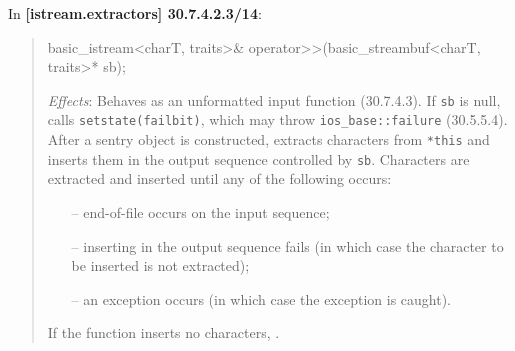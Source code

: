 \documentclass{wg21}
\begin{document}
In \textbf{[istream.extractors] 30.7.4.2.3/14}:
\begin{quote}
\begin{codeblock}
basic_istream<charT, traits>& operator>>(basic_streambuf<charT, traits>* sb);
\end{codeblock}
\textit{Effects}: Behaves as an unformatted input function (30.7.4.3). If \texttt{sb}
is null, calls \texttt{setstate(failbit)}, which may throw \texttt{ios_base::failure}
(30.5.5.4). After a sentry object is constructed, extracts characters from \texttt{*this}
and inserts them in the output sequence controlled by \texttt{sb}. Characters are
extracted and inserted until any of the following occurs:
\begin{itemize}
  \item[--] end-of-file occurs on the input sequence;
  \item[--] inserting in the output sequence fails (in which case the character to
            be inserted is not extracted);
  \item[--] an exception occurs (in which case the exception is caught).
\end{itemize}
If the function inserts no characters, .
\end{quote}
\end{document}
